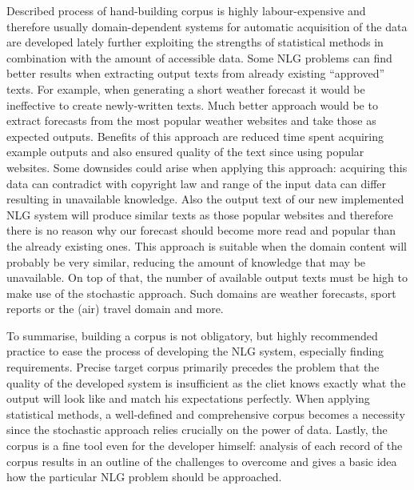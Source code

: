 Described process of hand-building corpus is highly labour-expensive and therefore usually domain-dependent systems for automatic acquisition of the data are developed lately further exploiting the strengths of statistical methods in combination with the amount of accessible data. Some NLG problems can find better results when extracting output texts from already existing ``approved” texts. For example, when generating a short weather forecast it would be ineffective to create newly-written texts. Much better approach would be to extract forecasts from the most popular weather websites and take those as expected outputs. Benefits of this approach are reduced time spent acquiring example outputs and also ensured quality of the text since using popular websites. Some downsides could arise when applying this approach: acquiring this data can contradict with copyright law and range of the input data can differ resulting in unavailable knowledge. Also the output text of our new implemented NLG system will produce similar texts as those popular websites and therefore there is no reason why our forecast should become more read and popular than the already existing ones. This approach is suitable when the domain content will probably be very similar, reducing the amount of knowledge that may be unavailable. On top of that, the number of available output texts must be high to make use of the stochastic approach. Such domains are weather forecasts, sport reports or the (air) travel domain and more.

To summarise, building a corpus is not obligatory, but highly recommended practice to ease the process of developing the NLG system, especially finding requirements. Precise target corpus primarily precedes the problem that the quality of the developed system is insufficient as the cliet knows exactly what the output will look like and match his expectations perfectly. When applying statistical methods, a well-defined and comprehensive corpus becomes a necessity since the stochastic approach relies crucially on the power of data. Lastly, the corpus is a fine tool even for the developer himself: analysis of each record of the corpus results in an outline of the challenges to overcome and gives a basic idea how the particular NLG problem should be approached.

